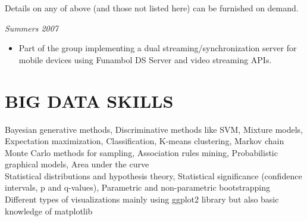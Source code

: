 \documentclass[margin, 10pt]{res} %
\begin{document}
\begin{resume}
Details on any of above (and those not listed here) can be furnished on demand.

{\sl \textbf{}} \hfill \textit{Summers 2007} \\
{\color{RubineRed}{Five Rivers Technologies, Lahore}}
\begin{itemize}
\item Part of the group implementing a dual streaming/synchronization server for mobile devices using Funambol DS Server and video streaming APIs.
\end{itemize} 

\section{BIG DATA SKILLS}
{\bf \color{Brown}{Machine Learning Skills:}} 
Bayesian generative methods, Discriminative methods like SVM, Mixture models, Expectation maximization, Classification, K-means clustering,  Markov chain Monte Carlo methods for sampling, Association rules mining, Probabilistic graphical models, Area under the curve  \\
{\bf \color{Brown}{Statistical Theory:}} Statistical distributions and hypothesis theory, Statistical significance (confidence intervals, p and q-values), Parametric and non-parametric bootstrapping \\
{\bf \color{Brown}{Statistical Visualization and reporting:}} Different types of visualizations mainly using ggplot2 library but also basic knowledge of matplotlib 



\end{resume}
\end{document}

